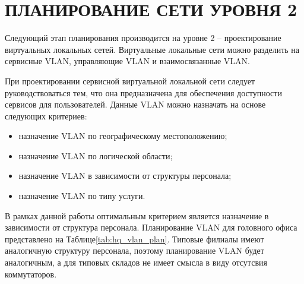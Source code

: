 \documentclass[14pt, a4paper]{extarticle}
\begin{document}
\section{ПЛАНИРОВАНИЕ СЕТИ УРОВНЯ 2}
Следующий этап планирования производится на уровне 2 – проектирование
виртуальных локальных сетей. Виртуальные локальные сети можно
разделить на сервисные VLAN, управляющие VLAN и взаимосвязанные VLAN.

При проектировании сервисной виртуальной локальной сети следует
руководствоваться тем, что она предназначена для обеспечения
доступности сервисов для пользователей. Данные VLAN можно назначать на
основе следующих критериев:
\begin{itemize}
\item назначение VLAN по географическому местоположению;
\item назначение VLAN по логической области;
\item назначение VLAN в зависимости от структуры персонала;
\item назначение VLAN по типу услуги.
\end{itemize}

В рамках данной работы оптимальным критерием является назначение в
зависимости от структура персонала. Планирование VLAN для головного
офиса представлено на Таблице\;\ref{tab:hq_vlan_plan}. Типовые филиалы
имеют аналогичную структуру персонала, поэтому планирование VLAN будет
аналогичным, а для типовых складов не имеет смысла в виду отсутсвия
коммутаторов.
\end{document}
